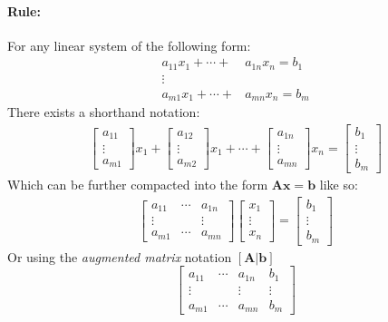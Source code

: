\documentclass[12pt]{article}
\newcommand{\A}{{\bm{A}}}
\newcommand{\xrule}[1]{\paragraph{\colorbox{#1!30}{\textbf{Rule:}}}}
\begin{document}
\xrule{green} For any linear system of the following form:
%
\begin{equation}
\begin{aligned}
	a_{11} x_1 + \cdots +& a_{1n} x_n = b_1 \\
    	         \vdots & \\
	a_{m1} x_1 + \cdots +& a_{mn} x_n = b_m
\end{aligned}
\end{equation}
%
There exists a shorthand notation:
%
\begin{equation}
\begin{aligned}
\begin{bmatrix}
    a_{11} \\
    \vdots \\
    a_{m1}
\end{bmatrix} x_1 + \begin{bmatrix}
    a_{12} \\
    \vdots \\
    a_{m2}
\end{bmatrix} x_1 + \cdots + \begin{bmatrix}
    a_{1n} \\
    \vdots \\
    a_{mn}
\end{bmatrix} x_n = \begin{bmatrix}
    b_{1} \\
    \vdots \\
    b_{m}
\end{bmatrix}
\end{aligned}
\end{equation}
%
Which can be further compacted into the form $\A \bm{x} = \bm{b}$ like so:
%
\begin{equation}
\begin{aligned}
\begin{bmatrix}
    a_{11} & \cdots & a_{1n} \\
    \vdots & & \vdots      \\
    a_{m1} & \cdots & a_{mn}
\end{bmatrix} \begin{bmatrix}
    x_{1} \\
    \vdots \\
    x_{n}
\end{bmatrix} = \begin{bmatrix}
    b_{1} \\
    \vdots \\
    b_{m}
\end{bmatrix}
\end{aligned}
\end{equation}
%
Or using the \textit{augmented matrix} notation $[\A | \bm{b}]$
%
\begin{equation}
\left[\begin{array}{ccc|c}
    a_{11} & \cdots & a_{1n} & b_{1}  \\
    \vdots &        & \vdots & \vdots \\ 
    a_{m1} & \cdots & a_{mn} & b_{m}
\end{array}\right]
\end{equation}
\end{document}
